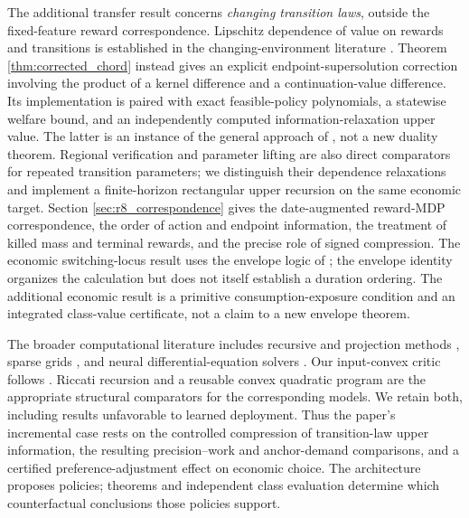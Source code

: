 The additional transfer result concerns \emph{changing transition laws}, outside the fixed-feature reward correspondence. Lipschitz dependence of value on rewards and transitions is established in the changing-environment literature \citep{csaji2008}. Theorem \ref{thm:corrected_chord} instead gives an explicit endpoint-supersolution correction involving the product of a kernel difference and a continuation-value difference. Its implementation is paired with exact feasible-policy polynomials, a statewise welfare bound, and an independently computed information-relaxation upper value. The latter is an instance of the general approach of \citet{brown2010}, not a new duality theorem. Regional verification and parameter lifting \citep{quatmann2016,heck2025} are also direct comparators for repeated transition parameters; we distinguish their dependence relaxations and implement a finite-horizon rectangular upper recursion on the same economic target. Section \ref{sec:r8_correspondence} gives the date-augmented reward-MDP correspondence, the order of action and endpoint information, the treatment of killed mass and terminal rewards, and the precise role of signed compression. The economic switching-locus result uses the envelope logic of \citet{milgrom2002}; the envelope identity organizes the calculation but does not itself establish a duration ordering. The additional economic result is a primitive consumption-exposure condition and an integrated class-value certificate, not a claim to a new envelope theorem.

The broader computational literature includes recursive and projection methods \citep{stokey1989,judd1998}, sparse grids \citep{brumm2017}, and neural differential-equation solvers \citep{raissi2019,han2018}. Our input-convex critic follows \citet{amos2017}. Riccati recursion and a reusable convex quadratic program are the appropriate structural comparators for the corresponding models. We retain both, including results unfavorable to learned deployment. Thus the paper's incremental case rests on the controlled compression of transition-law upper information, the resulting precision--work and anchor-demand comparisons, and a certified preference-adjustment effect on economic choice. The architecture proposes policies; theorems and independent class evaluation determine which counterfactual conclusions those policies support.
